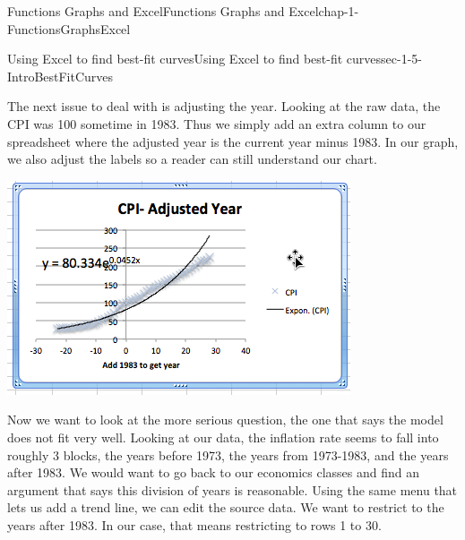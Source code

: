 \documentclass[oneside,10pt,]{book}
\numberwithin{equation}{section}
\begin{document}
\begin{chapterptx}{Functions Graphs and Excel}{}{Functions Graphs and Excel}{}{}{chap-1-FunctionsGraphsExcel}
\begin{sectionptx}{Using Excel to find best-fit curves}{}{Using Excel to find best-fit curves}{}{}{sec-1-5-IntroBestFitCurves}
\begin{sidebyside}{1}{0.1}{0.1}{0}
\begin{sbspanel}{0.8}
\end{sbspanel}%
\end{sidebyside}%
%
\par
\hypertarget{p-400}{}%
The next issue to deal with is adjusting the year.  Looking at the raw data, the CPI was 100 sometime in 1983.  Thus we simply add an extra column to our spreadsheet where the adjusted year is the current year minus 1983.  In our graph, we also adjust the labels so a reader can still understand our chart. \leavevmode%
\begin{sidebyside}{1}{0.1}{0.1}{0}%
\begin{sbspanel}{0.8}%
\includegraphics[width=1\linewidth]{images/sec1-5-13.png}
\end{sbspanel}%
\end{sidebyside}%
%
\par
\hypertarget{p-401}{}%
Now we want to look at the more serious question, the one that says the model does not fit very well.  Looking at our data, the inflation rate seems to fall into roughly 3 blocks, the years before 1973, the years from 1973-1983, and the years after 1983.  We would want to go back to our economics classes and find an argument that says this division of years is reasonable.  Using the same menu that lets us add a trend line, we can edit the source data.  We want to restrict to the years after 1983.  In our case, that means restricting to rows 1 to 30. \leavevmode%
\begin{sidebyside}{1}{0.1}{0.1}{0}%
\begin{sbspanel}{0.8}%

\end{sbspanel}
\end{sidebyside}
\end{sectionptx}
\end{chapterptx}
\end{document}
